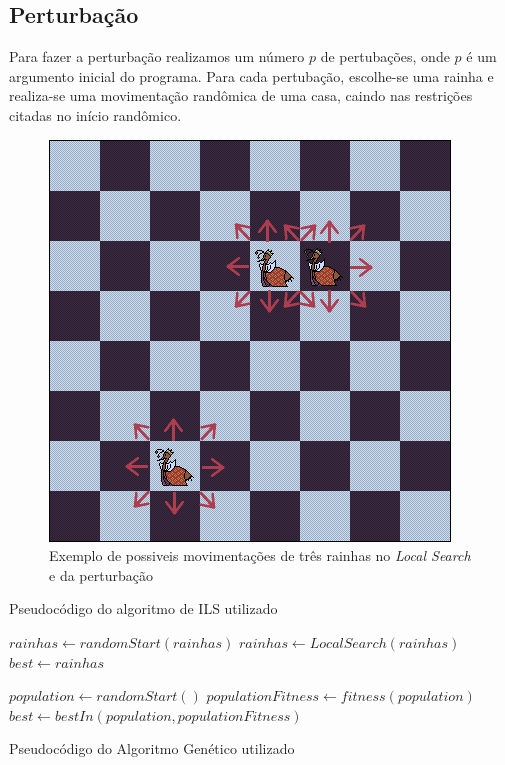 \documentclass[
	article,			%
	11pt,				%
	oneside,			%
	a4paper,			%
	english,			%
	brazil,				%
	sumario=tradicional
	]{abntex2}
\begin{document}
\subsection{Perturbação}
Para fazer a perturbação realizamos um número $p$ de pertubações, onde $p$ é um argumento inicial do programa. 
Para cada pertubação, escolhe-se uma rainha e realiza-se uma movimentação randômica de uma casa, caindo nas restrições citadas no início randômico.

\begin{figure}
  \centering
  \includegraphics[width=0.60\linewidth]{possiveisMovimentacoes.png}
  \caption{Exemplo de possiveis movimentações de três rainhas no \textit{Local Search} e da perturbação}
  \label{possiveisMovimentacoes}
\end{figure}

\LinesNumbered
\begin{algorithm}[ht]
  \label{pseudoILS}
  \caption{Pseudocódigo do algoritmo de ILS utilizado}
  $rainhas \gets randomStart(rainhas)$\;
  $rainhas \gets Local Search(rainhas)$\;
  $best \gets rainhas$\;
 \end{algorithm}

 \begin{algorithm}
  $population \gets randomStart()$\;
  $populationFitness \gets fitness(population)$\;
  $best \gets bestIn(population, populationFitness)$\;
  \caption{Pseudocódigo do Algoritmo Genético utilizado}
 \end{algorithm}
 
\end{document}
